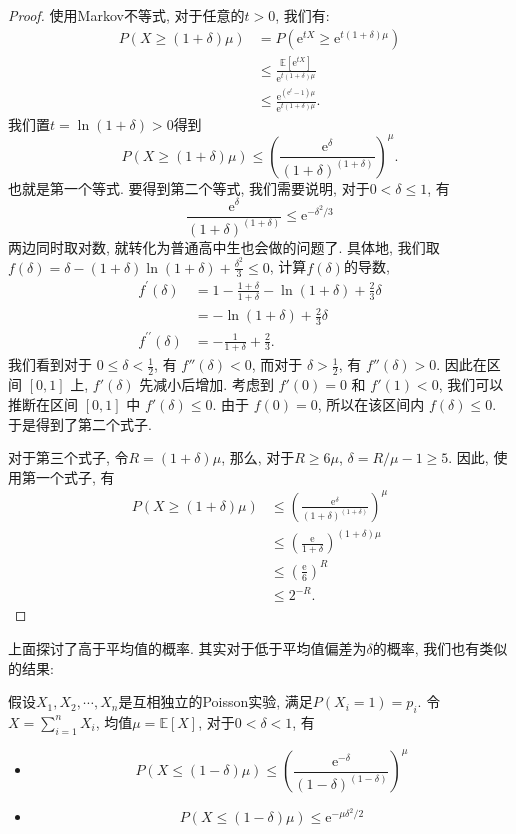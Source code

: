\begin{proof}
    使用Markov不等式, 对于任意的$t>0$, 我们有: 
    $$
\begin{aligned}
P(X \geq(1+\delta) \mu) & =P\left(\mathrm{e}^{t X} \geq \mathrm{e}^{t(1+\delta) \mu}\right) \\
& \leq \frac{\mathbb{E}\left[\mathrm{e}^{t X}\right]}{\mathrm{e}^{t(1+\delta) \mu}} \\
& \leq \frac{\mathrm{e}^{\left(\mathrm{e}^t-1\right) \mu}}{\mathrm{e}^{t(1+\delta) \mu}} .
\end{aligned}
$$
我们置$t=\ln(1+\delta)>0$得到
$$
P(X \geq(1+\delta) \mu) \leq\left(\frac{\mathrm{e}^\delta}{(1+\delta)^{(1+\delta)}}\right)^\mu.
$$
也就是第一个等式. 要得到第二个等式, 我们需要说明, 对于$0<\delta\leq 1$, 有
$$
\frac{\mathrm{e}^\delta}{(1+\delta)^{(1+\delta)}} \leq \mathrm{e}^{-\delta^2 / 3}
$$
两边同时取对数, 就转化为普通高中生也会做的问题了. 具体地, 我们取$f(\delta)=\delta-(1+\delta) \ln (1+\delta)+\frac{\delta^2}{3} \leq 0$, 计算$f(\delta)$的导数, 
$$
\begin{aligned}
f^{\prime}(\delta) & =1-\frac{1+\delta}{1+\delta}-\ln (1+\delta)+\frac{2}{3} \delta \\
& =-\ln (1+\delta)+\frac{2}{3} \delta \\
f^{\prime \prime}(\delta) & =-\frac{1}{1+\delta}+\frac{2}{3} .
\end{aligned}
$$
我们看到对于 $0 \leq \delta < \frac{1}{2}$, 有 $f''(\delta) < 0$, 而对于 $\delta > \frac{1}{2}$, 有 $f''(\delta) > 0$. 因此在区间 $[0, 1]$ 上, $f'(\delta)$ 先减小后增加. 
考虑到 $f'(0) = 0$ 和 $f'(1) < 0$, 我们可以推断在区间 $[0, 1]$ 中 $f'(\delta) \leq 0$. 由于 $f(0) = 0$, 所以在该区间内 $f(\delta) \leq 0$. 
于是得到了第二个式子. 

对于第三个式子, 令$R=(1+\delta) \mu$, 那么, 对于$R\geq 6\mu$, $\delta=R / \mu-1 \geq 5$. 因此, 使用第一个式子, 有$$\begin{aligned} P(X \geq(1+\delta) \mu) & \leq\left(\frac{\mathrm{e}^\delta}{(1+\delta)^{(1+\delta)}}\right)^\mu \\ & \leq\left(\frac{\mathrm{e}}{1+\delta}\right)^{(1+\delta) \mu} \\ & \leq\left(\frac{\mathrm{e}}{6}\right)^R \\ & \leq 2^{-R} .\end{aligned}$$
\end{proof}

上面探讨了高于平均值的概率. 其实对于低于平均值偏差为$\delta$的概率, 我们也有类似的结果: 
\begin{theorem}
    假设$X_1, X_2, \cdots, X_n$是互相独立的Poisson实验, 满足$P\left(X_i=1\right)=p_i$. 令$X=\sum_{i=1}^n X_i$, 均值$\mu=\mathbb{E}[X]$, 对于$0<\delta<1$, 有
    \begin{itemize}
        \item $$P(X \leq(1-\delta) \mu) \leq\left(\frac{\mathrm{e}^{-\delta}}{(1-\delta)^{(1-\delta)}}\right)^\mu$$
        \item $$P(X \leq(1-\delta) \mu) \leq \mathrm{e}^{-\mu \delta^2 / 2}$$
    \end{itemize}
\end{theorem}

